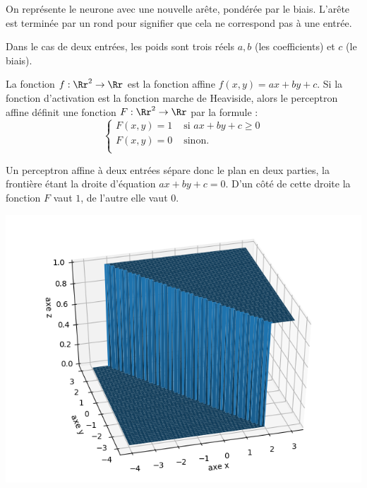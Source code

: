 \documentclass[11pt,class=report,crop=false]{standalone}
\begin{document}

On représente le neurone avec une nouvelle arête, pondérée par le biais. L'arête  est terminée par un rond pour signifier que cela ne correspond pas à une entrée.



Dans le cas de deux entrées, les poids sont trois réels $a,b$ (les coefficients) et $c$ (le biais).

La fonction $f : \Rr^2 \to \Rr$ est la fonction affine $f(x,y) =ax+by+c$.
Si la fonction d'activation est la fonction marche de Heaviside, alors le perceptron affine définit une fonction $F : \Rr^2 \to \Rr$ par la formule :
$$\begin{cases}
F(x,y) = 1 & \text{ si } ax+by+c \ge 0 \\
F(x,y) = 0  & \text{ sinon.} \\
\end{cases}$$


Un perceptron affine à deux entrées sépare donc le plan en deux parties, la frontière étant la droite d'équation $ax+by+c=0$.
D'un côté de cette droite la fonction $F$ vaut $1$, de l'autre elle vaut $0$.


\begin{center}
\includegraphics[scale=\myscale,scale=0.7]{figures/neurones-surface-4}
\end{center}
\end{document}
